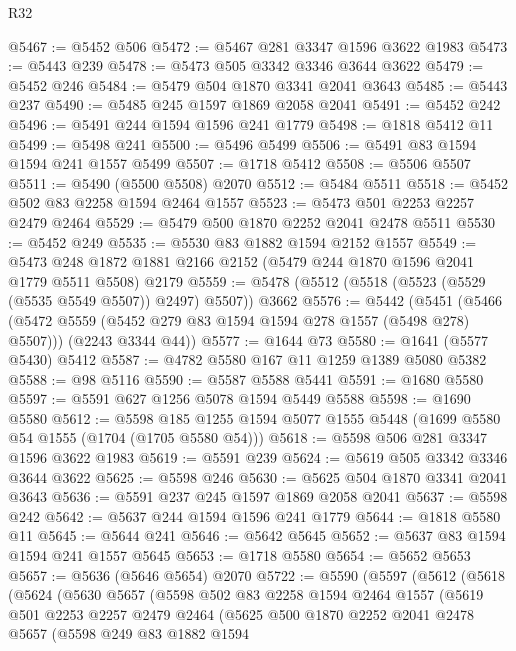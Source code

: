\begin{lexlean}{R32}
\begin{coremodule}
@5467 := @5452 @506
@5472 := @5467 @281 @3347 @1596 @3622 @1983
@5473 := @5443 @239
@5478 := @5473 @505 @3342 @3346 @3644 @3622
@5479 := @5452 @246
@5484 := @5479 @504 @1870 @3341 @2041 @3643
@5485 := @5443 @237
@5490 := @5485 @245 @1597 @1869 @2058 @2041
@5491 := @5452 @242
@5496 := @5491 @244 @1594 @1596 @241 @1779
@5498 := @1818 @5412 @11
@5499 := @5498 @241
@5500 := @5496 @5499
@5506 := @5491 @83 @1594 @1594 @241 @1557 @5499
@5507 := @1718 @5412
@5508 := @5506 @5507
@5511 := @5490 (@5500 @5508) @2070
@5512 := @5484 @5511
@5518 := @5452 @502 @83 @2258 @1594 @2464 @1557
@5523 := @5473 @501 @2253 @2257 @2479 @2464
@5529 := @5479 @500 @1870 @2252 @2041 @2478 @5511
@5530 := @5452 @249
@5535 := @5530 @83 @1882 @1594 @2152 @1557
@5549 := @5473 @248 @1872 @1881 @2166 @2152 (@5479 @244 @1870 @1596 @2041 @1779 @5511 @5508) @2179
@5559 := @5478 (@5512 (@5518 (@5523 (@5529 (@5535 @5549 @5507)) @2497) @5507)) @3662
@5576 := @5442
    (@5451
      (@5466 (@5472 @5559 (@5452 @279 @83 @1594 @1594 @278 @1557 (@5498 @278) @5507)))
      (@2243 @3344 @44))
@5577 := @1644 @73
@5580 := @1641 (@5577 @5430) @5412
@5587 := @4782 @5580 @167 @11 @1259 @1389 @5080 @5382
@5588 := @98 @5116
@5590 := @5587 @5588 @5441
@5591 := @1680 @5580
@5597 := @5591 @627 @1256 @5078 @1594 @5449 @5588
@5598 := @1690 @5580
@5612 := @5598 @185 @1255 @1594 @5077 @1555 @5448 (@1699 @5580 @54 @1555 (@1704 (@1705 @5580 @54)))
@5618 := @5598 @506 @281 @3347 @1596 @3622 @1983
@5619 := @5591 @239
@5624 := @5619 @505 @3342 @3346 @3644 @3622
@5625 := @5598 @246
@5630 := @5625 @504 @1870 @3341 @2041 @3643
@5636 := @5591 @237 @245 @1597 @1869 @2058 @2041
@5637 := @5598 @242
@5642 := @5637 @244 @1594 @1596 @241 @1779
@5644 := @1818 @5580 @11
@5645 := @5644 @241
@5646 := @5642 @5645
@5652 := @5637 @83 @1594 @1594 @241 @1557 @5645
@5653 := @1718 @5580
@5654 := @5652 @5653
@5657 := @5636 (@5646 @5654) @2070
@5722 := @5590
    (@5597
      (@5612
        (@5618
          (@5624
            (@5630
              @5657
              (@5598
                @502
                @83
                @2258
                @1594
                @2464
                @1557
                (@5619
                  @501
                  @2253
                  @2257
                  @2479
                  @2464
                  (@5625
                    @500
                    @1870
                    @2252
                    @2041
                    @2478
                    @5657
                    (@5598
                      @249
                      @83
                      @1882
                      @1594

\end{coremodule}
\end{lexlean}
